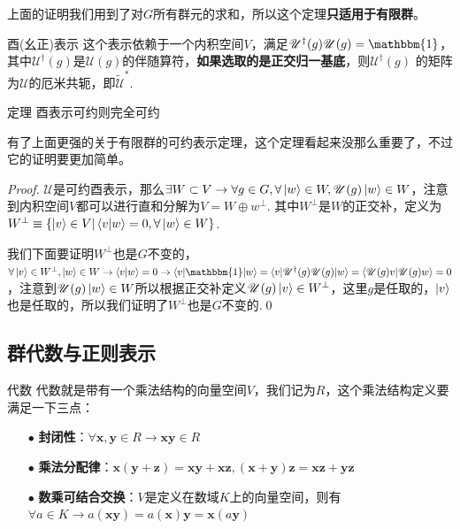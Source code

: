上面的证明我们用到了对$G$所有群元的求和，所以这个定理\textbf{只适用于有限群}。
\begin{define}{酉(幺正)表示}
    这个表示依赖于一个内积空间$V$，满足$\mathscr{U}^\dagger(g)\mathscr{U}(g)=\mathbbm{1}$，其中$\mathscr{U}^\dagger(g)$是$\mathscr{U}(g)$的伴随算符，\textbf{如果选取的是正交归一基底}，则$\mathscr{U}^\dagger(g)$
    的矩阵为$\mathcal{U}$的厄米共轭，即$\tilde{\mathcal{U}}^{*}$.
\end{define}
\begin{theorem}{定理}
    酉表示可约则完全可约
\end{theorem}
有了上面更强的关于有限群的可约表示定理，这个定理看起来没那么重要了，不过它的证明要更加简单。
\begin{proof}
    $\mathscr{U}$是可约酉表示，那么$\exists W\subset V\rightarrow \forall g\in G,\forall\ket{w}\in W,\mathscr{U}(g)\ket{w}\in W$，注意到内积空间$V$都可以进行直和分解为$V=W\oplus w^{\perp}$.
    其中$W^{\perp}$是$W$的正交补，定义为$W^{\perp}\equiv \{\ket{v}\in V|\braket{v|w}=0,\forall \ket{w}\in W\}$. 

    我们下面要证明$W^{\perp}$也是$G$不变的，$\forall \ket{v}\in W^{\perp},\ket{w}\in W\rightarrow \braket{v|w}=0\rightarrow\braket{v|\mathbbm{1}|w}=\braket{v|\mathscr{U}^\dagger(g)\mathscr{U}(g)|w}=\braket{\mathscr{U}(g)v|\mathscr{U}(g)w}=0$
    ，注意到$\mathscr{U}(g)\ket{w}\in W$所以根据正交补定义$\mathscr{U}(g)\ket{v}\in W^{\perp}$，这里$g$是任取的，$\ket{v}$也是任取的，所以我们证明了$W^{\perp}$也是$G$不变的.\qed
\end{proof}
\subsection{群代数与正则表示}
\begin{define}{代数}
    代数就是带有一个乘法结构的向量空间$V$，我们记为$R$，这个乘法结构定义要满足一下三点：
    \begin{itemize}
        \item[$\bullet$]\textbf{封闭性}：$\forall \mathbf{x},\mathbf{y}\in R\rightarrow \mathbf{x}\mathbf{y}\in R$
        \item[$\bullet$]\textbf{乘法分配律}：$\mathbf{x}(\mathbf{y}+\mathbf{z})=\mathbf{x}\mathbf{y}+\mathbf{x}\mathbf{z},(\mathbf{x}+\mathbf{y})\mathbf{z}=\mathbf{x}\mathbf{z}+\mathbf{y}\mathbf{z}$
        \item[$\bullet$]\textbf{数乘可结合交换}：$V$是定义在数域$K$上的向量空间，则有$\forall a\in K\rightarrow a(\mathbf{x}\mathbf{y})=a(\mathbf{x})\mathbf{y}=\mathbf{x}(a\mathbf{y})$
    \end{itemize}
\end{define}

